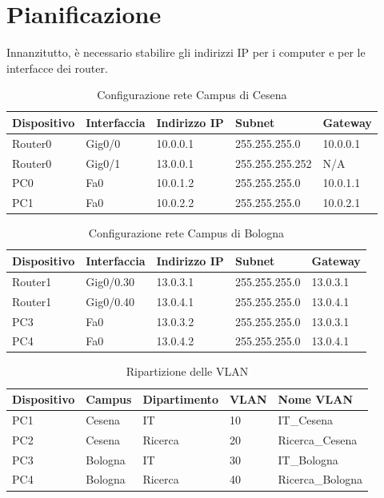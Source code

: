 \documentclass[a4paper,12pt]{report}
\begin{document}
\section{Pianificazione}
Innanzitutto, è necessario stabilire gli indirizzi IP per i computer e per le interfacce dei router.
\begin{table}[]
\begin{tabular}{@{}lllll@{}}
\toprule
Dispositivo & Interfaccia & Indirizzo IP & Subnet & Gateway \\ \midrule
Router0 & Gig0/0 & 10.0.0.1 & 255.255.255.0 & 10.0.0.1 \\
Router0 & Gig0/1 & 13.0.0.1 & 255.255.255.252 & N/A \\
PC0 & Fa0 & 10.0.1.2 & 255.255.255.0 & 10.0.1.1 \\
PC1 & Fa0 & 10.0.2.2 & 255.255.255.0 & 10.0.2.1 \\ \bottomrule
\end{tabular}
\caption{Configurazione rete Campus di Cesena}
\label{table:config_cesena}
\end{table}
\begin{table}[]
\begin{tabular}{lllll}
\hline
Dispositivo & Interfaccia & Indirizzo IP & Subnet & Gateway \\ \hline
Router1 & Gig0/0.30 & 13.0.3.1 & 255.255.255.0 & 13.0.3.1 \\
Router1 & Gig0/0.40 & 13.0.4.1 & 255.255.255.0 & 13.0.4.1 \\
PC3 & Fa0 & 13.0.3.2 & 255.255.255.0 & 13.0.3.1 \\
PC4 & Fa0 & 13.0.4.2 & 255.255.255.0 & 13.0.4.1 \\ \hline
\end{tabular}
\caption{Configurazione rete Campus di Bologna}
\label{table:config_bologna}
\end{table}
\begin{table}[]
\begin{tabular}{@{}lllll@{}}
\toprule
Dispositivo & Campus & Dipartimento & VLAN & Nome VLAN \\ \midrule
PC1 & Cesena & IT & 10 & IT\_Cesena \\
PC2 & Cesena & Ricerca & 20 & Ricerca\_Cesena \\
PC3 & Bologna & IT & 30 & IT\_Bologna \\
PC4 & Bologna & Ricerca & 40 & Ricerca\_Bologna \\ \bottomrule
\end{tabular}
\caption{Ripartizione delle VLAN}
\label{table:vlan_division}
\end{table}
\end{document}
